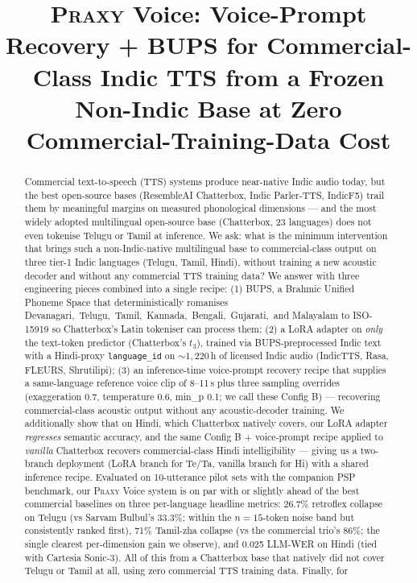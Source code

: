 \documentclass[conference,a4paper]{IEEEtran}
\newcommand{\psp}{\textsc{PSP}}
\newcommand{\praxy}{\textsc{Praxy}}
\newcommand{\bups}{\textsc{BUPS}}
\newcommand{\configb}{Config B}
\begin{document}
\title{\praxy{} Voice: Voice-Prompt Recovery + \bups{} for Commercial-Class Indic TTS from a Frozen Non-Indic Base at Zero Commercial-Training-Data Cost}

\author{
}

\maketitle

\begin{abstract}
\sloppy
Commercial text-to-speech (TTS) systems produce near-native Indic audio today, but the best open-source bases (ResembleAI Chatterbox, Indic Parler-TTS, IndicF5) trail them by meaningful margins on measured phonological dimensions --- and the most widely adopted multilingual open-source base (Chatterbox, 23 languages) does not even tokenise Telugu or Tamil at inference. We ask: what is the minimum intervention that brings such a non-Indic-native multilingual base to commercial-class output on three tier-1 Indic languages (Telugu, Tamil, Hindi), without training a new acoustic decoder and without any commercial TTS training data? We answer with three engineering pieces combined into a single recipe: (1) \bups{}, a Brahmic Unified Phoneme Space that deterministically romanises Devanagari,\ Telugu,\ Tamil,\ Kannada,\ Bengali,\ Gujarati,\ and Malayalam to ISO-15919 so Chatterbox's Latin tokeniser can process them; (2) a LoRA adapter on \emph{only} the text-token predictor (Chatterbox's $t_3$), trained via BUPS-preprocessed Indic text with a Hindi-proxy \texttt{language\_id} on ${\sim}1{,}220$\,h of licensed Indic audio (IndicTTS, Rasa, FLEURS, Shrutilipi); (3) an inference-time voice-prompt recovery recipe that supplies a same-language reference voice clip of 8--11\,s plus three sampling overrides (exaggeration 0.7, temperature 0.6, min\_p 0.1; we call these \configb) --- recovering commercial-class acoustic output without any acoustic-decoder training. We additionally show that on Hindi, which Chatterbox natively covers, our LoRA adapter \emph{regresses} semantic accuracy, and the same \configb{} + voice-prompt recipe applied to \emph{vanilla} Chatterbox recovers commercial-class Hindi intelligibility --- giving us a two-branch deployment (LoRA branch for Te/Ta, vanilla branch for Hi) with a shared inference recipe. Evaluated on 10-utterance pilot sets with the companion \psp{}~\cite{psp2026} benchmark, our \praxy{} Voice system is on par with or slightly ahead of the best commercial baselines on three per-language headline metrics: 26.7\% retroflex collapse on Telugu (vs Sarvam Bulbul's 33.3\%; within the $n=15$-token noise band but consistently ranked first), 71\% Tamil-zha collapse (vs the commercial trio's 86\%; the single clearest per-dimension gain we observe), and 0.025 LLM-WER on Hindi (tied with Cartesia Sonic-3). All of this from a Chatterbox base that natively did not cover Telugu or Tamil at all, using zero commercial TTS training data. Finally, for 
\end{abstract}
\end{document}
